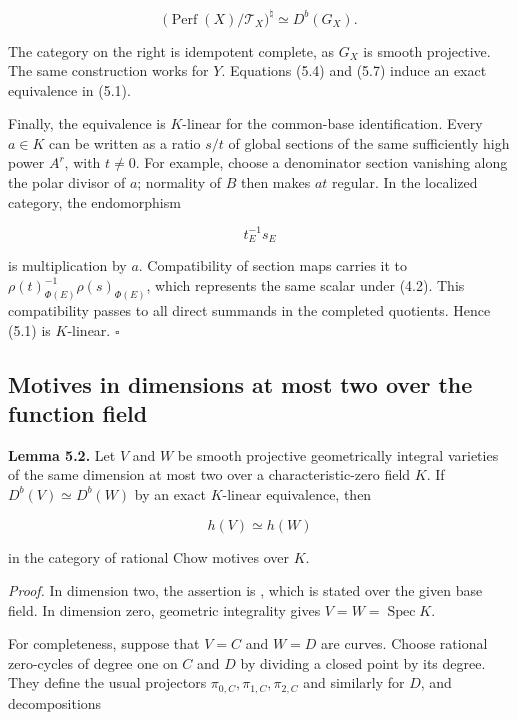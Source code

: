 \documentclass[11pt,a4paper]{article}
\begin{document}
\begin{equation*}
\bigl(\operatorname{Perf}(X)/\mathcal T_X\bigr)^{\natural}
\simeq D^b(G_X).
\tag{5.7}
\end{equation*}

The category on the right is idempotent complete, as $G_X$ is smooth projective. The same construction works for $Y$. Equations (5.4) and (5.7) induce an exact equivalence in (5.1).

Finally, the equivalence is $K$-linear for the common-base identification. Every $a\in K$ can be written as a ratio $s/t$ of global sections of the same sufficiently high power $A^r$, with $t\neq0$. For example, choose a denominator section vanishing along the polar divisor of $a$; normality of $B$ then makes $at$ regular. In the localized category, the endomorphism

\begin{equation*}
t_E^{-1}s_E
\end{equation*}

is multiplication by $a$. Compatibility of section maps carries it to $\rho(t)_{\Phi(E)}^{-1}\rho(s)_{\Phi(E)}$, which represents the same scalar under (4.2). This compatibility passes to all direct summands in the completed quotients. Hence (5.1) is $K$-linear. $\square$

\subsection{Motives in dimensions at most two over the function field}

\noindent \textbf{Lemma 5.2.} Let $V$ and $W$ be smooth projective geometrically integral varieties of the same dimension at most two over a characteristic-zero field $K$. If $D^b(V)\simeq D^b(W)$ by an exact $K$-linear equivalence, then

\begin{equation*}
h(V)\simeq h(W)
\end{equation*}

in the category of rational Chow motives over $K$.

\noindent \emph{Proof.} In dimension two, the assertion is \cite[Theorem 1.1]{FV21}, which is stated over the given base field. In dimension zero, geometric integrality gives $V=W=\operatorname{Spec}K$.

For completeness, suppose that $V=C$ and $W=D$ are curves. Choose rational zero-cycles of degree one on $C$ and $D$ by dividing a closed point by its degree. They define the usual projectors $\pi_{0,C},\pi_{1,C},\pi_{2,C}$ and similarly for $D$, and decompositions
\end{document}
